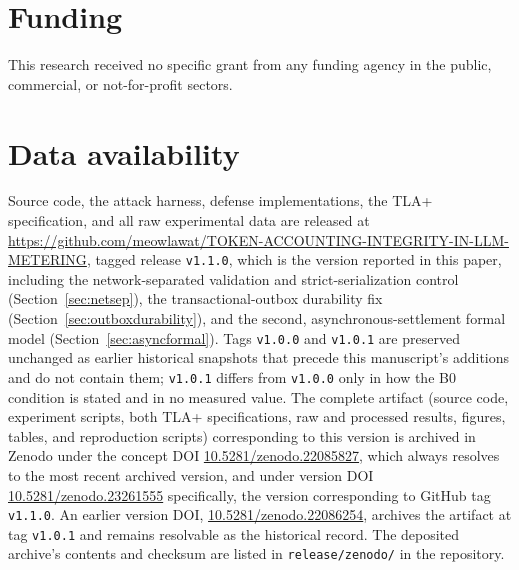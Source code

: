 \documentclass[final,5p,times,twocolumn,number]{elsarticle}
\begin{document}
\section*{Funding}
This research received no specific grant from any funding agency in the public,
commercial, or not-for-profit sectors.

\section*{Data availability}
Source code, the attack harness, defense implementations, the TLA+ specification, and all
raw experimental data are released at
\url{https://github.com/meowlawat/TOKEN-ACCOUNTING-INTEGRITY-IN-LLM-METERING}, tagged
release \texttt{v1.1.0}, which is the version reported in this paper, including the
network-separated validation and strict-serialization control (Section~\ref{sec:netsep}),
the transactional-outbox durability fix (Section~\ref{sec:outboxdurability}), and the
second, asynchronous-settlement formal model (Section~\ref{sec:asyncformal}). Tags
\texttt{v1.0.0} and
\texttt{v1.0.1} are preserved unchanged as earlier historical snapshots that precede this
manuscript's additions and do not contain them; \texttt{v1.0.1} differs from
\texttt{v1.0.0} only in how the B0 condition is stated and in no measured value. The
complete artifact (source code, experiment scripts, both TLA+ specifications, raw and
processed results, figures, tables, and reproduction scripts) corresponding to this
version is archived in Zenodo under the concept DOI
\href{https://doi.org/10.5281/zenodo.22085827}{10.5281/zenodo.22085827}, which always
resolves to the most recent archived version, and under version DOI
\href{https://doi.org/10.5281/zenodo.23261555}{10.5281/zenodo.23261555} specifically, the
version corresponding to GitHub tag \texttt{v1.1.0}. An earlier version DOI,
\href{https://doi.org/10.5281/zenodo.22086254}{10.5281/zenodo.22086254}, archives the
artifact at tag \texttt{v1.0.1} and remains resolvable as the historical record. The
deposited archive's contents and checksum are listed in \texttt{release/zenodo/} in the
repository.
\end{document}
